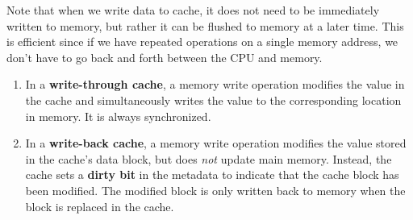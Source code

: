   \begin{definition}
    \label{def:write-through-write-back-cache}
    Note that when we write data to cache, it does not need to be immediately written to memory, but rather it can be flushed to memory at a later time. This is efficient since if we have repeated operations on a single memory address, we don't have to go back and forth between the CPU and memory. 
    \begin{enumerate}
      \item In a \textbf{write-through cache}, a memory write operation modifies the value in the cache and simultaneously writes the value to the corresponding location in memory. It is always synchronized. 
      \item In a \textbf{write-back cache}, a memory write operation modifies the value stored in the cache's data block, but does \textit{not} update main memory. Instead, the cache sets a \textbf{dirty bit} in the metadata to indicate that the cache block has been modified. The modified block is only written back to memory when the block is replaced in the cache. 

      \begin{figure}[H]
        \centering 
\end{figure}
\end{enumerate}
\end{definition}
